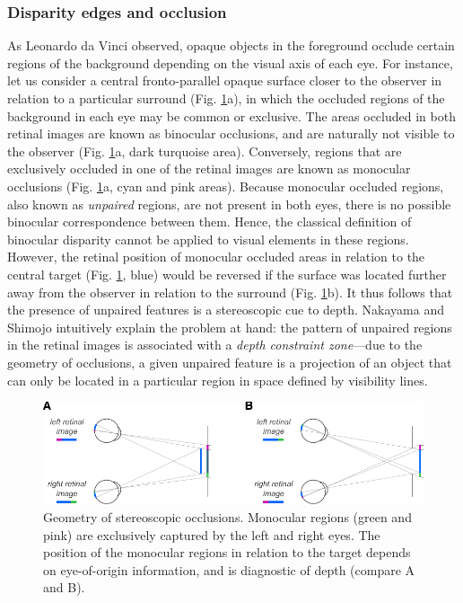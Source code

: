 \subsubsection{Disparity edges and occlusion}

As Leonardo da Vinci observed, opaque objects in the foreground occlude certain regions of the background depending on the visual axis of each eye. For instance, let us consider a central fronto-parallel opaque surface closer to the observer in relation to a particular surround (Fig. \ref{fig:monocc}a), in which the occluded regions of the background in each eye may be common or exclusive. The areas occluded in both retinal images are known as binocular occlusions, and are naturally not visible to the observer (Fig. \ref{fig:monocc}a, dark turquoise area). Conversely, regions that are exclusively occluded in one of the retinal images are known as monocular occlusions (Fig. \ref{fig:monocc}a, cyan and pink areas). Because monocular occluded regions, also known as \textit{unpaired} regions, are not present in both eyes, there is no possible binocular correspondence between them. Hence, the classical definition of binocular disparity cannot be applied to visual elements in these regions. However, the retinal position of monocular occluded areas in relation to the central target (Fig. \ref{fig:monocc}, blue) would be reversed if the surface was located further away from the observer in relation to the surround (Fig. \ref{fig:monocc}b). It thus follows that the presence of unpaired features is a stereoscopic cue to depth. Nakayama and Shimojo \cite{Nakayama:1990fc} intuitively explain the problem at hand: the pattern of unpaired regions in the retinal images is associated with a \textit{depth constraint zone}---due to the geometry of occlusions, a given unpaired feature is a projection of an object that can only be located in a particular region in space defined by visibility lines.

\begin{figure}
  \centering
  \includegraphics[width=14cm, keepaspectratio]{monocular-occlusion}
  \caption[Geometry of stereoscopic occlusions.]{Geometry of stereoscopic occlusions. Monocular regions (green and pink) are exclusively captured by the left and right eyes. The position of the monocular regions in relation to the target depends on eye-of-origin information, and is diagnostic of depth (compare A and B).}
  \label{fig:monocc}
\end{figure}

